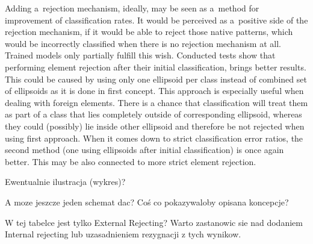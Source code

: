 \documentclass{llncs}
\begin{document}

Adding a~rejection mechanism, ideally, may be seen as a~method for improvement of classification rates. It would be perceived as a~positive side of the rejection mechanism, if it would be able to reject those native patterns, which would be incorrectly classified when there is no rejection mechanism at all. Trained models only partially fulfill this wish. Conducted tests show that performing element rejection after their initial classification, brings better results. This could be caused by using only one ellipsoid per class instead of combined set of ellipsoids as it is done in first concept. This approach is especially useful when dealing with foreign elements. There is a chance that classification will treat them as part of a class that lies completely outside of corresponding ellipsoid, whereas they could (possibly) lie inside other ellipsoid and therefore be not rejected when using first approach. When it comes down to strict classification error ratios, the second method (one using ellipsoids after initial classification) is once again better. This may be also connected to more strict element rejection.

{\color{blue}Ewentualnie ilustracja (wykres)?}

{\color{cyan} A moze jeszcze jeden schemat dac? Coś co pokazywaloby opisana koncepcje?}

{\color{red}W tej tabelce jest tylko External Rejecting? Warto zastanowic sie nad dodaniem Internal rejecting lub uzasadnieniem rezygnacji z tych wynikow.}

\end{document}
